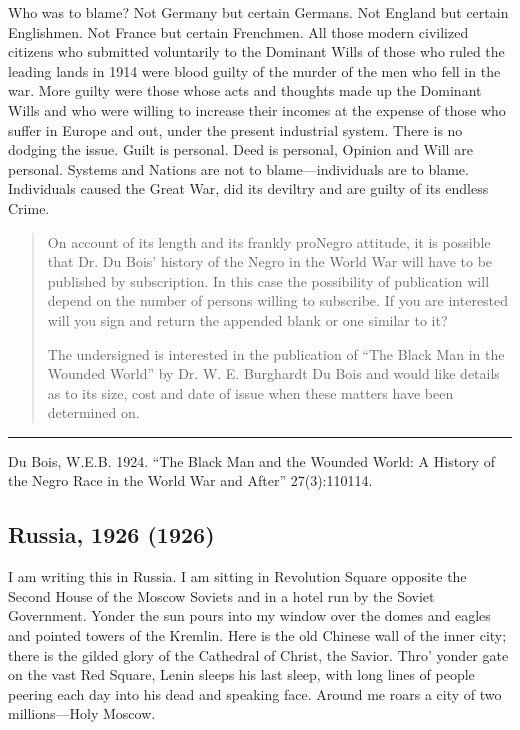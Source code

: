 \documentclass[letterpaper,10pt,english]{jupyterBook}
\begin{document}
\sphinxAtStartPar
Who was to blame? Not Germany but certain Germans. Not England but certain Englishmen. Not France but certain Frenchmen. All those modern civilized citizens who submitted voluntarily to the Dominant Wills of those who ruled the leading lands in 1914 were blood guilty of the murder of the men who fell in the war. More guilty were those whose acts and thoughts made up the Dominant Wills and who were willing to increase their incomes at the expense of those who suffer in Europe and out, under the present industrial system. There is no dodging the issue. Guilt is personal. Deed is personal, Opinion and Will are personal. Systems and Nations are not to blame—individuals are to blame. Individuals caused the Great War, did its deviltry and are guilty of its endless Crime.
\begin{quote}

\sphinxAtStartPar
On account of its length and its frankly pro\sphinxhyphen{}Negro attitude, it is possible that Dr. Du Bois’ history of the Negro in the World War will have to be published by subscription. In this case the possibility of publication will depend on the number of persons willing to subscribe. If you are interested will you sign and return the appended blank or one similar to it?

\sphinxAtStartPar
The undersigned is interested in the publication of “The Black Man in the Wounded World” by Dr. W. E. Burghardt Du Bois and would like details as to its size, cost and date of issue when these matters have been determined on.
\end{quote}


\bigskip\hrule\bigskip


\sphinxAtStartPar
{} Du Bois, W.E.B. 1924. “The Black Man and the Wounded World: A History of the Negro Race in the World War and After” 27(3):110\sphinxhyphen{}114.


\subsection{Russia, 1926 (1926)}
\label{\detokenize{Volumes/33/01/russia_1926:russia-1926-1926}}\label{\detokenize{Volumes/33/01/russia_1926::doc}}
\sphinxAtStartPar
I am writing this in Russia. I am sitting in Revolution Square opposite the Second House of the Moscow Soviets and in a hotel run by the Soviet Government. Yonder the sun pours into my window over the domes and eagles and pointed towers of the Kremlin. Here is the old Chinese wall of the inner city; there is the gilded glory of the Cathedral of Christ, the Savior. Thro’ yonder gate on the vast Red Square, Lenin sleeps his last sleep, with long lines of people peering each day into his dead and speaking face. Around me roars a city of two millions—Holy Moscow.
\end{document}

